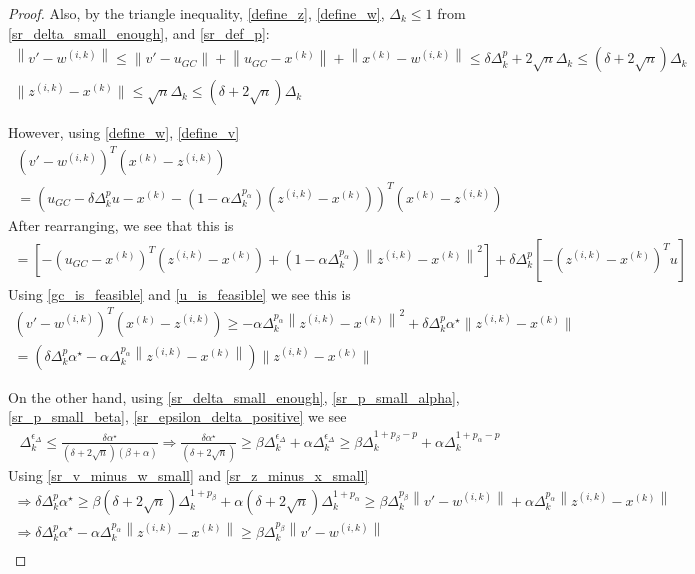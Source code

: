 \documentclass{article}
\theoremstyle{case}
\newcommand{\xk}{{x^{(k)}}}
\newcommand{\dk}{\Delta_k}
\newcommand{\zik}{{z^{(i, k)}}}
\newcommand{\wik}{{w^{(i, k)}}}
\newcommand{\minanglealpha}{{ \alpha^{\star} }}
\begin{document}
\begin{proof}
Also, by the triangle inequality, \cref{define_z}, \cref{define_w}, $\dk \le 1$ from \cref{sr_delta_small_enough}, and \cref{sr_def_p}:
\begin{align}
\left\|v' - \wik\right\| \le \left\|v' - u_{GC}\right\| + \left\|u_{GC} - \xk \right\| + \left\|\xk - \wik\right\| \le \delta \dk^p + 2\sqrt{n}\dk \le \left(\delta + 2\sqrt{n}\right)\dk \label{sr_v_minus_w_small} \\
\|\zik - \xk \| \le \sqrt{n}\dk \le \left(\delta + 2\sqrt{n}\right)\dk \label{sr_z_minus_x_small}
\end{align}

However, using \cref{define_w}, \cref{define_v}
\begin{align*}
\left(v' - \wik \right)^T\left(\xk - \zik \right) \\
=\left( u_{GC} - \delta\dk^{p}u - \xk - \left(1 - \alpha\dk^{p_{\alpha}}\right)\left(\zik - \xk\right) \right)^T\left(\xk - \zik \right)
\end{align*}
After rearranging, we see that this is
\begin{align*}
=\left[
-\left( u_{GC}- \xk\right)^T\left(\zik - \xk \right) 
+\left(1 - \alpha\dk^{p_{\alpha}}\right)\left\|\zik - \xk\right\|^2
\right]
+ \delta\dk^{p}\left[ -\left(\zik - \xk\right)^Tu\right]
\end{align*}
Using \cref{gc_is_feasible} and \cref{u_is_feasible} we see this is
\begin{align}
\left(v' - \wik \right)^T\left(\xk - \zik \right)  \ge - \alpha \dk ^{p_{\alpha}} \left\|\zik - \xk\right\|^2
+ \delta\dk^{p} \minanglealpha \|\zik - \xk\| \nonumber \\
= \left(
\delta\dk^{p} \minanglealpha
- \alpha \dk ^{p_{\alpha}} \left\|\zik - \xk\right\|
\right)\|\zik - \xk\| \label{sr_what_to_bound}
\end{align}

On the other hand, using \cref{sr_delta_small_enough}, \cref{sr_p_small_alpha}, \cref{sr_p_small_beta}, \cref{sr_epsilon_delta_positive} we see
\begin{align*}
\dk^{\epsilon_{\Delta}} \le \frac{\delta \minanglealpha}{\left(\delta + 2\sqrt{n}\right) \left(\beta +\alpha\right)} 
\Longrightarrow\frac{ \delta \minanglealpha }{\left(\delta + 2\sqrt{n}\right)} \ge \beta\dk^{\epsilon_{\Delta}} + \alpha\dk^{\epsilon_{\Delta}} 
\ge \beta \dk^{1 + p_{\beta} - p} + \alpha \dk ^{1 + p_{\alpha} - p}
\end{align*}
Using \cref{sr_v_minus_w_small} and \cref{sr_z_minus_x_small}
\begin{align*}
\Longrightarrow \delta\dk^{p} \minanglealpha  \ge \beta \left(\delta + 2\sqrt{n}\right) \dk^{1 + p_{\beta}} + \alpha\left(\delta + 2\sqrt{n}\right)  \dk ^{1 + p_{\alpha}}
\ge \beta \dk^{p_{\beta}}\left\|v' - \wik\right\| + \alpha \dk ^{p_{\alpha}} \left\|\zik - \xk\right\|\\
\Longrightarrow \delta\dk^{p} \minanglealpha - \alpha \dk ^{p_{\alpha}} \left\|\zik - \xk\right\|  \ge \beta \dk^{p_{\beta}}\left\|v' - \wik\right\| \\
\end{align*}


\end{proof}
\end{document}

